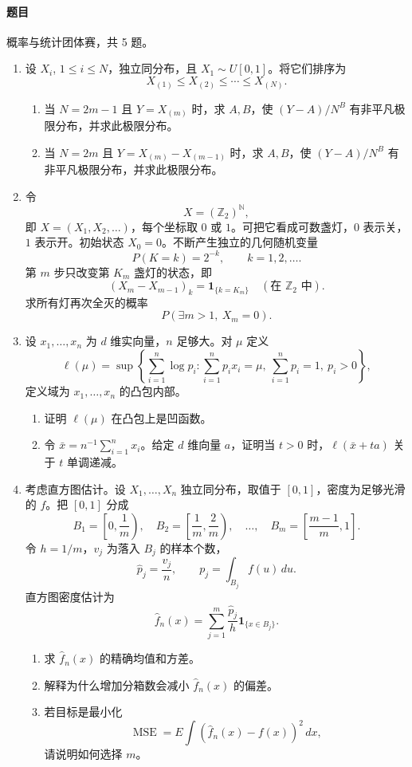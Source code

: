 \documentclass[UTF8,12pt]{ctexart}
\begin{document}
\paragraph{题目}
概率与统计团体赛，共 5 题。
\begin{enumerate}[label=\textbf{\arabic*.},leftmargin=2.2em]
\item 设 \(X_i\), \(1\le i\le N\)，独立同分布，且 \(X_1\sim U[0,1]\)。将它们排序为
\[
X_{(1)}\le X_{(2)}\le\cdots\le X_{(N)}.
\]
\begin{enumerate}[label=\textbf{(\alph*)},leftmargin=2.4em]
\item 当 \(N=2m-1\) 且 \(Y=X_{(m)}\) 时，求 \(A,B\)，使 \((Y-A)/N^B\) 有非平凡极限分布，并求此极限分布。
\item 当 \(N=2m\) 且 \(Y=X_{(m)}-X_{(m-1)}\) 时，求 \(A,B\)，使 \((Y-A)/N^B\) 有非平凡极限分布，并求此极限分布。
\end{enumerate}

\item 令
\[
X=(\mathbb Z_2)^{\mathbb N},
\]
即 \(X=(X_1,X_2,\ldots)\)，每个坐标取 \(0\) 或 \(1\)。可把它看成可数盏灯，\(0\) 表示关，\(1\) 表示开。初始状态 \(X_0=0\)。不断产生独立的几何随机变量
\[
P(K=k)=2^{-k},\qquad k=1,2,\ldots.
\]
第 \(m\) 步只改变第 \(K_m\) 盏灯的状态，即
\[
(X_m-X_{m-1})_k=\mathbf 1_{\{k=K_m\}}\quad(\text{在 }\mathbb Z_2\text{ 中}).
\]
求所有灯再次全灭的概率
\[
P(\exists m>1,\ X_m=0).
\]

\item 设 \(x_1,\ldots,x_n\) 为 \(d\) 维实向量，\(n\) 足够大。对 \(\mu\) 定义
\[
\ell(\mu)=
\sup\left\{\sum_{i=1}^n\log p_i:
\sum_{i=1}^n p_i x_i=\mu,\ 
\sum_{i=1}^n p_i=1,\ p_i>0
\right\},
\]
定义域为 \(x_1,\ldots,x_n\) 的凸包内部。
\begin{enumerate}[label=\textbf{(\alph*)},leftmargin=2.4em]
\item 证明 \(\ell(\mu)\) 在凸包上是凹函数。
\item 令 \(\bar x=n^{-1}\sum_{i=1}^n x_i\)。给定 \(d\) 维向量 \(a\)，证明当 \(t>0\) 时，\(\ell(\bar x+ta)\) 关于 \(t\) 单调递减。
\end{enumerate}

\item 考虑直方图估计。设 \(X_1,\ldots,X_n\) 独立同分布，取值于 \([0,1]\)，密度为足够光滑的 \(f\)。把 \([0,1]\) 分成
\[
B_1=\left[0,\frac1m\right),\quad
B_2=\left[\frac1m,\frac2m\right),\quad\ldots,\quad
B_m=\left[\frac{m-1}{m},1\right].
\]
令 \(h=1/m\)，\(v_j\) 为落入 \(B_j\) 的样本个数，
\[
\widehat p_j=\frac{v_j}{n},\qquad
p_j=\int_{B_j}f(u)\,du.
\]
直方图密度估计为
\[
\widehat f_n(x)=\sum_{j=1}^m\frac{\widehat p_j}{h}\mathbf 1_{\{x\in B_j\}}.
\]
\begin{enumerate}[label=\textbf{(\arabic*)},leftmargin=2.4em]
\item 求 \(\widehat f_n(x)\) 的精确均值和方差。
\item 解释为什么增加分箱数会减小 \(\widehat f_n(x)\) 的偏差。
\item 若目标是最小化
\[
\operatorname{MSE}=E\int(\widehat f_n(x)-f(x))^2\,dx,
\]
请说明如何选择 \(m\)。
\end{enumerate}


\end{enumerate}
\end{document}
